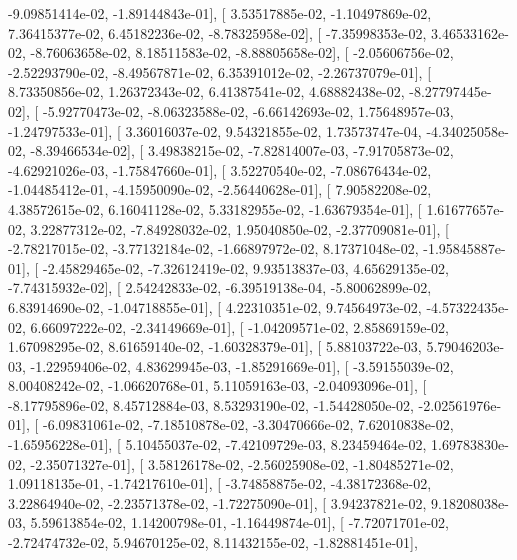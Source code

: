 \documentclass{article}
\begin{document}
         -9.09851414e-02,  -1.89144843e-01],
       [  3.53517885e-02,  -1.10497869e-02,   7.36415377e-02,
          6.45182236e-02,  -8.78325958e-02],
       [ -7.35998353e-02,   3.46533162e-02,  -8.76063658e-02,
          8.18511583e-02,  -8.88805658e-02],
       [ -2.05606756e-02,  -2.52293790e-02,  -8.49567871e-02,
          6.35391012e-02,  -2.26737079e-01],
       [  8.73350856e-02,   1.26372343e-02,   6.41387541e-02,
          4.68882438e-02,  -8.27797445e-02],
       [ -5.92770473e-02,  -8.06323588e-02,  -6.66142693e-02,
          1.75648957e-03,  -1.24797533e-01],
       [  3.36016037e-02,   9.54321855e-02,   1.73573747e-04,
         -4.34025058e-02,  -8.39466534e-02],
       [  3.49838215e-02,  -7.82814007e-03,  -7.91705873e-02,
         -4.62921026e-03,  -1.75847660e-01],
       [  3.52270540e-02,  -7.08676434e-02,  -1.04485412e-01,
         -4.15950090e-02,  -2.56440628e-01],
       [  7.90582208e-02,   4.38572615e-02,   6.16041128e-02,
          5.33182955e-02,  -1.63679354e-01],
       [  1.61677657e-02,   3.22877312e-02,  -7.84928032e-02,
          1.95040850e-02,  -2.37709081e-01],
       [ -2.78217015e-02,  -3.77132184e-02,  -1.66897972e-02,
          8.17371048e-02,  -1.95845887e-01],
       [ -2.45829465e-02,  -7.32612419e-02,   9.93513837e-03,
          4.65629135e-02,  -7.74315932e-02],
       [  2.54242833e-02,  -6.39519138e-04,  -5.80062899e-02,
          6.83914690e-02,  -1.04718855e-01],
       [  4.22310351e-02,   9.74564973e-02,  -4.57322435e-02,
          6.66097222e-02,  -2.34149669e-01],
       [ -1.04209571e-02,   2.85869159e-02,   1.67098295e-02,
          8.61659140e-02,  -1.60328379e-01],
       [  5.88103722e-03,   5.79046203e-03,  -1.22959406e-02,
          4.83629945e-03,  -1.85291669e-01],
       [ -3.59155039e-02,   8.00408242e-02,  -1.06620768e-01,
          5.11059163e-03,  -2.04093096e-01],
       [ -8.17795896e-02,   8.45712884e-03,   8.53293190e-02,
         -1.54428050e-02,  -2.02561976e-01],
       [ -6.09831061e-02,  -7.18510878e-02,  -3.30470666e-02,
          7.62010838e-02,  -1.65956228e-01],
       [  5.10455037e-02,  -7.42109729e-03,   8.23459464e-02,
          1.69783830e-02,  -2.35071327e-01],
       [  3.58126178e-02,  -2.56025908e-02,  -1.80485271e-02,
          1.09118135e-01,  -1.74217610e-01],
       [ -3.74858875e-02,  -4.38172368e-02,   3.22864940e-02,
         -2.23571378e-02,  -1.72275090e-01],
       [  3.94237821e-02,   9.18208038e-03,   5.59613854e-02,
          1.14200798e-01,  -1.16449874e-01],
       [ -7.72071701e-02,  -2.72474732e-02,   5.94670125e-02,
          8.11432155e-02,  -1.82881451e-01],
\end{document}
